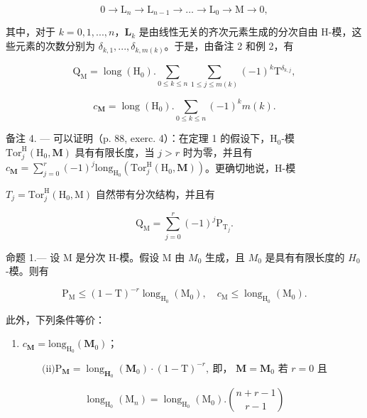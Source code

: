 \[
0 \to \mathrm{L} _ {n} \to \mathrm{L} _ {n - 1} \to \dots \to \mathrm{L} _ {0} \to \mathrm{M} \to 0,
\]

其中，对于 \(k=0,1,...,n\)，\(\mathbf{L}_{k}\) 是由线性无关的齐次元素生成的分次自由 H-模，这些元素的次数分别为 \(\delta_{k,1},..., \delta_{k,m(k)}\)。于是，由备注 2 和例 2，有

\[
\mathrm{Q} _ {\mathrm{M}} = \operatorname{long} (\mathrm{H} _ {0}). \sum_ {0 \leqslant k \leqslant n} \sum_ {1 \leqslant j \leqslant m (k)} (- 1) ^ {k} \mathrm{T} ^ {\delta_ {k, j}},
\]

\[
c _ {\mathbf {M}} = \operatorname{long} (\mathrm{H} _ {0}). \sum_ {0 \leqslant k \leqslant n} (- 1) ^ {k} m (k).
\]

备注 4. --- 可以证明（p. 88, exerc. 4）：在定理 1 的假设下，\(\mathrm{H}_{0}\)-模 \(\mathrm{Tor}_{j}^{\mathrm{H}}(\mathrm{H}_{0},\mathbf{M})\) 具有有限长度，当 \(j > r\) 时为零，并且有 \(c_{\mathbf{M}} = \sum_{j=0}^{r} (-1)^{j} \mathrm{long}_{\mathrm{H}_{0}}(\mathrm{Tor}_{j}^{\mathrm{H}}(\mathrm{H}_{0},\mathbf{M}))\)。更确切地说，H-模

\(T_{j} = \text{Tor}_{j}^{\text{H}}(\text{H}_{0}, \text{M})\) 自然带有分次结构，并且有

\[
\mathrm{Q} _ {\mathrm{M}} = \sum_ {j = 0} ^ {r} (- 1) ^ {j} \mathrm{P} _ {\mathrm{T} _ {j}}.
\]

命题 1.--- 设 M 是分次 H-模。假设 M 由 \(M_{0}\) 生成，且 \(M_{0}\) 是具有有限长度的 \(H_{0}\)-模。则有

\[
\mathrm{P} _ {\mathrm{M}} \leqslant (1 - \mathrm{T}) ^ {- r} \operatorname{long} _ {\mathrm{H} _ {0}} (\mathrm{M} _ {0}), \quad c _ {\mathrm{M}} \leqslant \operatorname{long} _ {\mathrm{H} _ {0}} (\mathrm{M} _ {0}).
\]

此外，下列条件等价：

\begin{enumerate}
\def\labelenumi{(\roman{enumi})}
\tightlist
\item
  \(c_{\mathbf{M}} = \mathrm{long}_{\mathrm{H_0}}(\mathbf{M}_0)\)；
\end{enumerate}

\[
\text{(ii)} \mathrm{P}_{\mathbf{M}} = \operatorname{long}_{\mathbf{H}_{0}}(\mathbf{M}_{0}) \cdot (1 - \mathrm{T})^{-r},\ \text{即， }\mathbf{M} = \mathbf{M}_{0}\text{ 若 }r=0\text{ 且}
\]

\[
\operatorname{long} _ {\mathrm{H} _ {0}} \left(\mathrm{M} _ {n}\right) = \operatorname{long} _ {\mathrm{H} _ {0}} \left(\mathrm{M} _ {0}\right). \binom {n + r - 1} {r - 1}
\]

